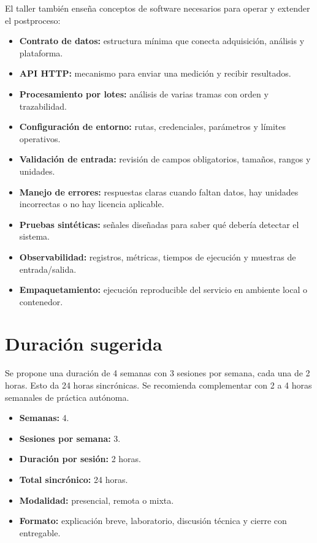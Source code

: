\documentclass[11pt,a4paper]{article}
\begin{document}
El taller también enseña conceptos de software necesarios para operar y extender el postproceso:

\begin{itemize}
  \item \textbf{Contrato de datos:} estructura mínima que conecta adquisición, análisis y plataforma.
  \item \textbf{API HTTP:} mecanismo para enviar una medición y recibir resultados.
  \item \textbf{Procesamiento por lotes:} análisis de varias tramas con orden y trazabilidad.
  \item \textbf{Configuración de entorno:} rutas, credenciales, parámetros y límites operativos.
  \item \textbf{Validación de entrada:} revisión de campos obligatorios, tamaños, rangos y unidades.
  \item \textbf{Manejo de errores:} respuestas claras cuando faltan datos, hay unidades incorrectas o no hay licencia aplicable.
  \item \textbf{Pruebas sintéticas:} señales diseñadas para saber qué debería detectar el sistema.
  \item \textbf{Observabilidad:} registros, métricas, tiempos de ejecución y muestras de entrada/salida.
  \item \textbf{Empaquetamiento:} ejecución reproducible del servicio en ambiente local o contenedor.
\end{itemize}

\section*{Duración sugerida}

Se propone una duración de 4 semanas con 3 sesiones por semana, cada una de 2 horas. Esto da 24 horas sincrónicas. Se recomienda complementar con 2 a 4 horas semanales de práctica autónoma.

\begin{itemize}
  \item \textbf{Semanas:} 4.
  \item \textbf{Sesiones por semana:} 3.
  \item \textbf{Duración por sesión:} 2 horas.
  \item \textbf{Total sincrónico:} 24 horas.
  \item \textbf{Modalidad:} presencial, remota o mixta.
  \item \textbf{Formato:} explicación breve, laboratorio, discusión técnica y cierre con entregable.
\end{itemize}
\end{document}
